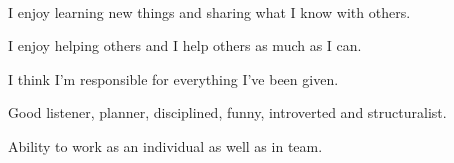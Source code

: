 

    ‌

    \begin{cvitems} %
        \item {I enjoy learning new things and sharing what I know with others.}
        \item {I enjoy helping others and I help others as much as I can.}
        \item {I think I'm responsible for everything I've been given.}
        \item {Good listener, planner, disciplined, funny, introverted and structuralist.}
        \item {Ability to work as an individual as well as in team.}
    \end{cvitems}
